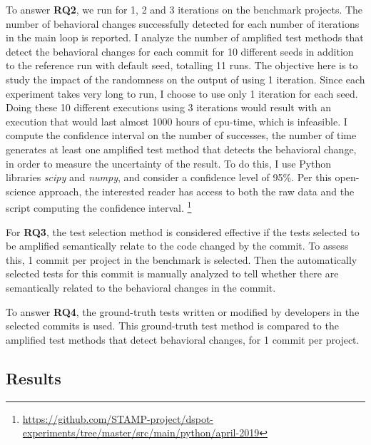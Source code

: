 To answer \textbf{RQ2}, we run \DCII for 1, 2 and 3 iterations on the benchmark projects.
The number of behavioral changes successfully detected for each number of iterations in the main loop is reported.
I analyze the number of amplified test methods that detect the behavioral changes for each commit for 10 different seeds in addition to the reference run with default seed, totalling 11 runs.
The objective here is to study the impact of the randomness on the output of \DCII using 1 iteration.
Since each experiment takes very long to run, I choose to use only 1 iteration for each seed.
Doing these 10 different executions using 3 iterations would result with an execution that would last almost 1000 hours of cpu-time, which is infeasible.
I compute the confidence interval on the number of successes, \ie the number of time \DCI generates at least one amplified test method that detects the behavioral change, in order to measure the uncertainty of the result.
To do this, I use Python libraries \emph{scipy} and \emph{numpy}, and consider a confidence level of 95\%. 
Per this open-science approach, the interested reader has access to both the raw data and the script computing the confidence interval. \footnote{\url{https://github.com/STAMP-project/dspot-experiments/tree/master/src/main/python/april-2019}}

For \textbf{RQ3}, the test selection method is considered effective if the tests selected to be amplified semantically relate to the code changed by the commit. 
To assess this, 1 commit per project in the benchmark is selected.
Then the automatically selected tests for this commit is manually analyzed to tell whether there are semantically related to the behavioral changes in the commit. 

To answer \textbf{RQ4}, the ground-truth tests written or modified by developers in the selected commits is used.
This ground-truth test method is compared to the amplified test methods that detect behavioral changes, for 1 commit per project.

\subsection{Results}
\label{subsec:result}



